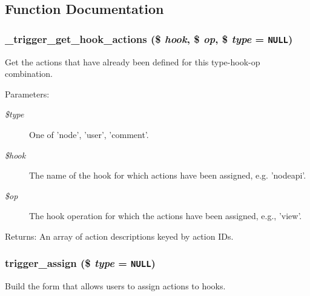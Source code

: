 \subsection{Function Documentation}
\hypertarget{trigger_8admin_8inc_918f527b019873c09fa8eab68415a355}{
\subsubsection[{\_\-trigger\_\-get\_\-hook\_\-actions}]{\setlength{\rightskip}{0pt plus 5cm}\_\-trigger\_\-get\_\-hook\_\-actions (\$ {\em hook}, \/  \$ {\em op}, \/  \$ {\em type} = {\tt NULL})}}
\label{trigger_8admin_8inc_918f527b019873c09fa8eab68415a355}


Get the actions that have already been defined for this type-hook-op combination.

\begin{Desc}
\item[Parameters:]
\begin{description}
\item[{\em \$type}]One of 'node', 'user', 'comment'. \item[{\em \$hook}]The name of the hook for which actions have been assigned, e.g. 'nodeapi'. \item[{\em \$op}]The hook operation for which the actions have been assigned, e.g., 'view'. \end{description}
\end{Desc}
\begin{Desc}
\item[Returns:]An array of action descriptions keyed by action IDs. \end{Desc}
\hypertarget{trigger_8admin_8inc_85741ccca04cdb6fabb8c6c644902013}{
\subsubsection[{trigger\_\-assign}]{\setlength{\rightskip}{0pt plus 5cm}trigger\_\-assign (\$ {\em type} = {\tt NULL})}}
\label{trigger_8admin_8inc_85741ccca04cdb6fabb8c6c644902013}


Build the form that allows users to assign actions to hooks.

